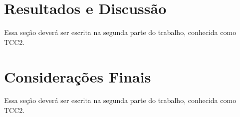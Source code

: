 \documentclass[12pt]{article}
\begin{document}
\section{Resultados e Discussão}
Essa seção deverá ser escrita na segunda parte do trabalho, conhecida como TCC2.

\section{Considerações Finais}
Essa seção deverá ser escrita na segunda parte do trabalho, conhecida como TCC2.

\printbibliography  %
\end{document}
